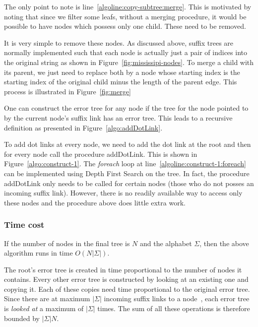 The only point to note is line~\ref{algoline:copy-subtree:merge}. This is motivated by noting that since we filter some leafs, without a merging procedure, it would be possible to have nodes which possess only one child. These need to be removed.

It is very simple to remove these nodes. As discussed above, suffix trees are normally implemented such that each node is actually just a pair of indices into the original string as shown in Figure~\ref{fig:mississipi-nodes}. To merge a child with its parent, we just need to replace both by a node whose starting index is the starting index of the original child minus the length of the parent edge. This process is illustrated in Figure~\ref{fig:merge} 



One can construct the error tree for any node if the tree for the node pointed to by the current node's suffix link has an error tree. This leads to a recursive definition as presented in Figure~\ref{algo:addDotLink}. 



To add dot links at every node, we need to add the dot link at the root and then for every node call the procedure addDotLink. This is shown in Figure~\ref{algo:construct-1}. The \textit{foreach} loop at line~\ref{algoline:construct-1:foreach} can be implemented using Depth First Search on the tree. In fact, the procedure addDotLink only needs to be called for certain nodes (those who do not posses an incoming suffix link). However, there is no readily available way to access only these nodes and the procedure above does little extra work.

\subsubsection{Time cost}

If the number of nodes in the final tree is $N$ and the alphabet $\Sigma$, then the above algorithm runs in time $O(N|\Sigma|)$.

The root's error tree is created in time proportional to the number of nodes it contains. Every other error tree is constructed by looking at an existing one and copying it. Each of these copies need time proportional to the original error tree. Since there are at maximum $|\Sigma|$ incoming suffix links to a node~\cite{}, each error tree is \emph{looked at} a maximum of $|\Sigma|$ times. The sum of all these operations is therefore bounded by $|\Sigma|N$.

